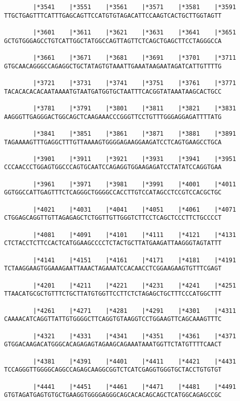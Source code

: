 \documentclass{article}
\begin{document}
\begin{Verbatim}
        |*3541    |*3551    |*3561    |*3571    |*3581    |*3591
TTGCTGAGTTTCATTTGAGCAGTTCCATGTGTAGACATTCCAAGTCACTGCTTGGTAGTT
  
        |*3601    |*3611    |*3621    |*3631    |*3641    |*3651
GCTGTGGGAGCCTGTCATTGGCTATGGCCAGTTAGTTCTCAGCTGAGCTTCCTAGGGCCA
  
        |*3661    |*3671    |*3681    |*3691    |*3701    |*3711
GTGCAACAGGGCCAGAGGCTGCTATAGTGTAAATTGAAATAAGAATAGATCATTGTTTTG
  
        |*3721    |*3731    |*3741    |*3751    |*3761    |*3771
TACACACACACAATAAAATGTAATGATGGTGCTAATTTCACGGTATAAATAAGCACTGCC
  
        |*3781    |*3791    |*3801    |*3811    |*3821    |*3831
AAGGGTTGAGGGACTGGCAGCTCAAGAAACCCGGGTTCCTGTTTGGGAGGAGATTTTATG
  
        |*3841    |*3851    |*3861    |*3871    |*3881    |*3891
TAGAAAAGTTTGAGGCTTTGTTAAAAGTGGGGAGAAGGAAGATCCTCAGTGAAGCCTGCA
  
        |*3901    |*3911    |*3921    |*3931    |*3941    |*3951
CCCAACCCTGGAGTGGCCCAGTGCAATCCAGAGGTGGAAGAGATCCTATATCCAGGTGAA
  
        |*3961    |*3971    |*3981    |*3991    |*4001    |*4011
GGTGGCCATTGAGTTTCTCAGGGCTGGGGCCACCTTGTCCATAGCCTCCGTCCACGCTGC
  
        |*4021    |*4031    |*4041    |*4051    |*4061    |*4071
CTGGAGCAGGTTGTTAGAGAGCTCTGGTTGTTGGGTCTTCCTCAGCTCCCTTCTGCCCCT
  
        |*4081    |*4091    |*4101    |*4111    |*4121    |*4131
CTCTACCTCTTCCACTCATGGAAGCCCCTCTACTGCTTATGAAGATTAAGGGTAGTATTT
  
        |*4141    |*4151    |*4161    |*4171    |*4181    |*4191
TCTAAGGAAGTGGAAAGAATTAAACTAGAAATCCACAACCTCGGAAGAAGTGTTTCGAGT
  
        |*4201    |*4211    |*4221    |*4231    |*4241    |*4251
TTAACATGCGCTGTTTCTGCTTATGTGGTTCCTTCTCTAGAGCTGCTTTCCCATGGCTTT
  
        |*4261    |*4271    |*4281    |*4291    |*4301    |*4311
CAAAACATCAGGTTATTGTGGGGCTTCAGGTGTAAGGTCCTGGAAGTTCAGCAAAGTTTC
  
        |*4321    |*4331    |*4341    |*4351    |*4361    |*4371
GTGGACAAGACATGGGCACAGAGAGTAGAAGCAGAAATAAATGGTTCTATGTTTTCAACT
  
        |*4381    |*4391    |*4401    |*4411    |*4421    |*4431
TCCAGGGTTGGGGCAGGCCAGAGCAAGGCGGTCTCATCGAGGTGGGTGCTACCTGTGTGT
  
        |*4441    |*4451    |*4461    |*4471    |*4481    |*4491
GTGTAGATGAGTGTGCTGAAGGTGGGGAGGGCAGCACACAGCAGCTCATGGCAGAGCCGC
  

\end{Verbatim}
\end{document}
